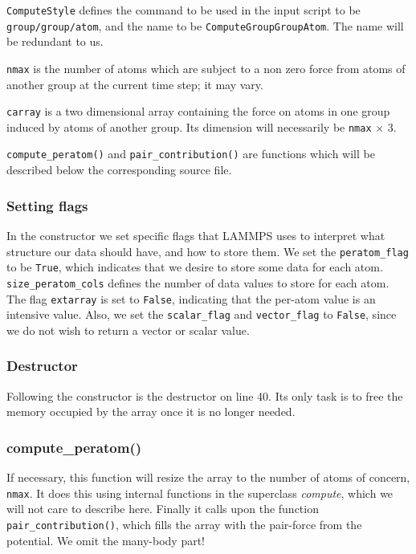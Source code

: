 \documentclass[twoside,english]{uiofysmaster}
\begin{document}
\texttt{ComputeStyle} defines the command to be used in the input script to be \linebreak[1] \texttt{group/group/atom}, and the name to be \texttt{ComputeGroupGroupAtom}. 
The name will be redundant to us. 

\texttt{nmax} is the number of atoms which are subject to a non zero force from atoms of another group at the current time step; it may vary.

\texttt{carray} is a two dimensional array containing the force on atoms in one group induced by atoms of another group. Its dimension will necessarily be \texttt{nmax} $\times$ 3.

\texttt{compute\_peratom()} and \texttt{pair\_contribution()} are functions which will be described below the corresponding source file. 





\subsubsection{Setting flags}
In the constructor we set specific flags that LAMMPS uses to interpret what structure our data should have, and how to store them. 
We set the \texttt{peratom\_flag} to be \texttt{True}, which indicates that we desire to store some data for each atom. 
\texttt{size\_peratom\_cols} defines the number of data values to store for each atom. 
The flag \texttt{extarray} is set to \texttt{False}, indicating that the per-atom value is an intensive value. 
Also, we set the \texttt{scalar\_flag} and \texttt{vector\_flag} to \texttt{False}, since we do not wish to return a vector or scalar value.

\subsubsection{Destructor}
Following the constructor is the destructor on line 40. Its only task is to free the memory occupied by the array once it is no longer needed.  

\subsubsection{compute\_peratom()}
 If necessary, this function will resize the array to the number of atoms of concern, \texttt{nmax}. 
 It does this using internal functions in the superclass \textit{compute}, which we will not care to describe here. 
 Finally it calls upon the function \texttt{pair\_contribution()}, which fills the array with the pair-force from the potential. {\huge  We omit the many-body part!}
\end{document}
